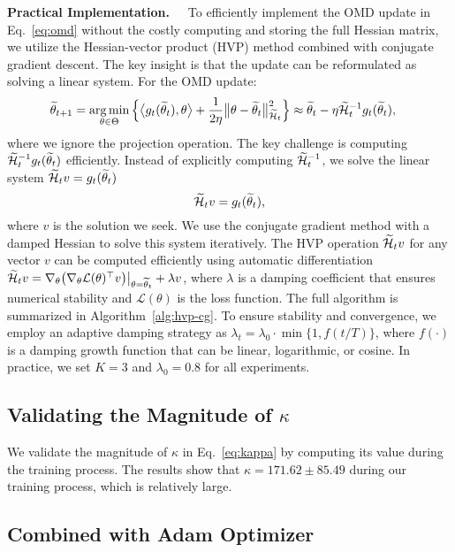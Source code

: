 \noindent \textbf{Practical Implementation.~~}
To efficiently implement the OMD update in Eq.~\eqref{eq:omd} without the costly computing and storing the full Hessian matrix, we utilize the Hessian-vector product (HVP) method combined with conjugate gradient descent. The key insight is that the update can be reformulated as solving a linear system.
For the OMD update:
\begin{align*}
    \widetilde{\theta}_{t+1} & = \operatorname*{arg\,min}_{\theta \in \Theta} \Big\{\big\langle g_t(\widetilde{\theta}_t), \theta \big\rangle +\frac{1}{2 \eta}\big\|\theta-\widetilde{\theta}_t\big\|_{\widetilde{\mathcal{H}}_t}^2\Big\}  \approx \widetilde{\theta}_t - \eta \widetilde{\mathcal{H}}_t^{-1}g_t(\widetilde{\theta}_t),
\end{align*}
where we ignore the projection operation.
The key challenge is computing \(\widetilde{\mathcal{H}}_t^{-1}g_t(\widetilde{\theta}_t)\) efficiently. Instead of explicitly computing \(\widetilde{\mathcal{H}}_t^{-1}\), we solve the linear system $\widetilde{\mathcal{H}}_t v = g_t(\widetilde{\theta}_t)$
\begin{equation*}
    \widetilde{\mathcal{H}}_t v = g_t(\widetilde{\theta}_t),
\end{equation*}
where \(v\) is the solution we seek. We use the conjugate gradient method with a damped Hessian to solve this system iteratively.
The HVP operation \(\widetilde{\mathcal{H}}_t v\) for any vector \(v\) can be computed efficiently using automatic differentiation $\widetilde{\mathcal{H}}_t v = \nabla_\theta \big(\nabla_\theta \mathcal{L}(\theta)^\top v\big)\big|_{\theta=\widetilde{\theta}_t} + \lambda v$, where \(\lambda\) is a damping coefficient that ensures numerical stability and \(\mathcal{L}(\theta)\) is the loss function. The full algorithm is summarized in Algorithm~\ref{alg:hvp-cg}. To ensure stability and convergence, we employ an adaptive damping strategy as $\lambda_t = \lambda_0 \cdot \min\{1, f(t/T)\}$, where $f(\cdot)$ is a damping growth function that can be linear, logarithmic, or cosine. In practice, we set $K = 3$ and $\lambda_0 = 0.8$ for all experiments.


\subsection{Validating the Magnitude of $\kappa$}  
\label{subsec:detail_exp:kappa}  

We validate the magnitude of $\kappa$ in Eq.~\eqref{eq:kappa} by computing its value during the training process. The results show that $\kappa = 171.62 \pm 85.49$ during our training process, which is relatively large.


\subsection{Combined with Adam Optimizer}
\label{subsec:detail_exp:adam}

